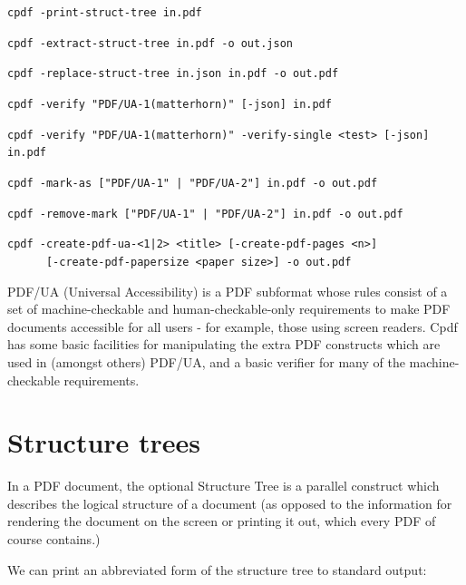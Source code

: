 \documentclass{book}
\begin{document}
  {\small\begin{framed}
  \noindent\verb!cpdf -print-struct-tree in.pdf!

  \vspace{1.5mm}
  \noindent\verb!cpdf -extract-struct-tree in.pdf -o out.json!

  \vspace{1.5mm}
  \noindent\verb!cpdf -replace-struct-tree in.json in.pdf -o out.pdf!

  \vspace{1.5mm}
  \noindent\verb!cpdf -verify "PDF/UA-1(matterhorn)" [-json] in.pdf!

  \vspace{1.5mm}
  \noindent\verb!cpdf -verify "PDF/UA-1(matterhorn)" -verify-single <test> [-json] in.pdf!

  \vspace{1.5mm}
  \noindent\verb!cpdf -mark-as ["PDF/UA-1" | "PDF/UA-2"] in.pdf -o out.pdf!

  \vspace{1.5mm}
  \noindent\verb!cpdf -remove-mark ["PDF/UA-1" | "PDF/UA-2"] in.pdf -o out.pdf!

  \vspace{1.5mm}
  \noindent\verb!cpdf -create-pdf-ua-<1|2> <title> [-create-pdf-pages <n>]!\\
  \noindent\verb!      [-create-pdf-papersize <paper size>] -o out.pdf!

  \end{framed}}

PDF/UA (Universal Accessibility) is a PDF subformat whose rules consist of a set of machine-checkable and human-checkable-only requirements to make PDF documents accessible for all users - for example, those using screen readers. Cpdf has some basic facilities for manipulating the extra PDF constructs which are used in (amongst others) PDF/UA, and a basic verifier for many of the machine-checkable requirements.

\section{Structure trees}

In a PDF document, the optional Structure Tree is a parallel construct which describes the logical structure of a document (as opposed to the information for rendering the document on the screen or printing it out, which every PDF of course contains.)

We can print an abbreviated form of the structure tree to standard output:
\end{document}
